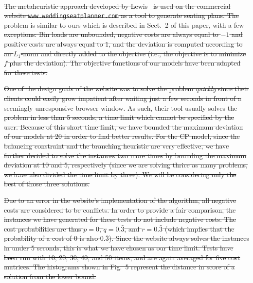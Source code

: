 \documentclass{llncs}
\begin{document}
\paragraph{}\st{The metaheuristic approach developed by Lewis}~\cite{Lewis2013} \st{is used on the commercial website \texttt{www.weddingseatplanner.com} as a tool to generate seating plans. The problem is similar to ours which is described in Sect.~2 of this paper, with a few exceptions: Bin loads are unbounded, negative costs are always equal to $-1$ and positive costs are always equal to 1, and the deviation is computed according to an $L_{1}$-norm and directly added to the objective (i.e., the objective is to minimize $f$ plus the deviation). The objective functions of our models have been adapted for these tests.}

\st{One of the design goals of the website was to solve the problem \emph{quickly} since their clients could easily grow impatient after waiting just a few seconds in front of a seemingly unresponsive browser window. As such, their tool usually solves the problem in less than 5 seconds, a time limit which cannot be specified by the user. Because of this short time limit, we have bounded the maximum deviation of our models at 20 in order to find better results. For the CP model, since the balancing constraint and the branching heuristic are very effective, we have further decided to solve the instances two more times by bounding the maximum deviation at 10 and 5, respectively (since we are solving thrice as many problems, we have also divided the time limit by three). We will be considering only the best of those three solutions.}

\st{Due to an error in the website's implementation of the algorithm, all negative costs are considered to be conflicts. In order to provide a fair comparison, the instances we have generated for these tests do not include negative costs. The cost probabilities are thus $p=0$, $q=0.\bar{3}$, and $r=0.\bar{3}$ (which implies that the probability of a cost of 0 is also $0.\bar{3}$). Since the website always solves the instances in under 5 seconds, this is what we have chosen as our time limit. Tests have been run with 10, 20, 30, 40, and 50 items, and are again averaged for five cost matrices. The histograms shown in Fig.~5 represent the distance in score of a solution from the lower bound.}
\end{document}
